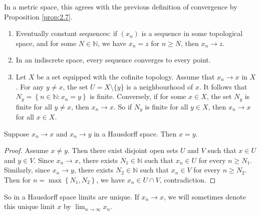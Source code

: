\documentclass[a4paper,11pt]{article}
\begin{document}
\begin{note}
    In a metric space, this agrees with the previous definition of convergence by Proposition \ref{prop:2.7}.
\end{note}

\begin{example}
    \begin{enumerate}
        \item Eventually constant sequences: if $\left(x_{n}\right)$ is a sequence in some topological space, and for some $N \in \mathbb{N}$, we have $x_{n}=z$ for $n \geqslant N$, then $x_{n} \rightarrow z$.
      
        \item In an indiscrete space, every sequence converges to every point.
      
        \item Let $X$ be a set equipped with the cofinite topology. Assume that $x_{n} \rightarrow x$ in $X$. For any $y \neq x$, the set $U=X \setminus \{y\}$ is a neighbourhood of $x$. It follows that $N_{y}=\left\{n \in \mathbb{N}: x_{n}=y\right\}$ is finite. Conversely, if for some $x \in X$, the set $N_{y}$ is finite for all $y \neq x$, then $x_{n} \rightarrow x$. So if $N_{y}$ is finite for all $y \in X$, then $x_{n} \rightarrow x$ for all $x \in X$.
      \end{enumerate}
\end{example}

\begin{proposition}
    Suppose $x_{n} \rightarrow x$ and $x_{n} \rightarrow y$ in a Hausdorff space. Then $x=y$.
\end{proposition}

\begin{proof}
    Assume $x \neq y$. Then there exist disjoint open sets $U$ and $V$ such that $x \in U$ and $y \in V$. Since $x_{n} \rightarrow x$, there exists $N_{1} \in \mathbb{N}$ such that $x_{n} \in U$ for every $n \geqslant N_{1}$. Similarly, since $x_{n} \rightarrow y$, there exists $N_{2} \in \mathbb{N}$ such that $x_{n} \in V$ for every $n \geqslant N_{2}$. Then for $n=\max \left\{N_{1}, N_{2}\right\}$, we have $x_{n} \in U \cap V$, contradiction.
\end{proof}

\begin{remark}
    So in a Hausdorff space limits are unique. If $x_{n} \rightarrow x$, we will sometimes denote this unique limit $x$ by $\lim _{n \rightarrow \infty} x_{n}$.
\end{remark}
\end{document}
